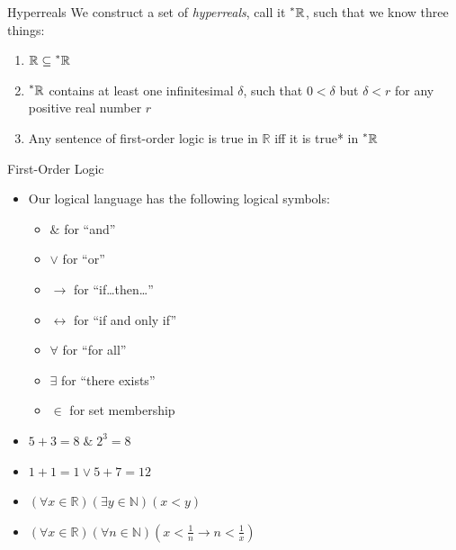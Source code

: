 \documentclass{beamer}
\theoremstyle{plain}
\theoremstyle{definition}
\newcommand{\reals}{\mathbb{R}}
\newcommand{\hreals}{\prescript{*}{}{\mathbb{R}}}
\newcommand{\nats}{\mathbb{N}}
\begin{document}
\begin{frame}{Hyperreals} 
We construct a set of \textit{hyperreals}, call it $\hreals$, such that we know three things: \vspace{4pt}
\begin{enumerate} \itemsep = 6pt
	\item $\reals \subseteq \hreals$
	\item $\hreals$ contains at least one infinitesimal $\delta$, such that $0 < \delta$ but $\delta < r$ for any positive real number $r$
	\item Any sentence of first-order logic is true in $\reals$ iff it is true* in $\hreals$
\end{enumerate}
\end{frame}

\begin{frame}{First-Order Logic}
\begin{itemize} \itemsep = 6pt
	\item Our logical language has the following logical symbols:
	\begin{itemize}
		\item $\&$ for ``and''
		\item $\lor$ for ``or''
		\item $\to$ for ``if\ldots then\ldots''
		\item $\leftrightarrow$ for ``if and only if''
		\item $\forall$ for ``for all''
		\item $\exists$ for ``there exists''
		\item $\in$ for set membership
	\end{itemize} 
	\item $5 + 3 = 8 \;\&\; 2^3 = 8$
	\item $1 + 1 = 1 \lor 5 + 7 = 12$
	\item $(\forall x \in \reals)(\exists y \in \nats)(x < y)$
	\item $(\forall x \in \reals)(\forall n \in \nats)(x < \frac{1}{n} \to n < \frac{1}{x})$
\end{itemize}
\end{frame}
\end{document}
